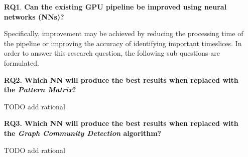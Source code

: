 \begin{enumerate}
  \item[\textbf{RQ1}.] \textbf{Can the existing GPU pipeline be improved using neural networks (NNs)?}

    Specifically, improvement may be achieved by reducing the processing time
    of the pipeline or improving the accuracy of identifying important
    timeslices. In order to answer this research question, the following sub
    questions are formulated.

  \item[\textbf{RQ2.}] \textbf{Which NN will produce the best results when replaced with the \emph{Pattern Matrix}?}

    TODO add rational

  \item[\textbf{RQ3.}] \textbf{Which NN will produce the best results when replaced with the \emph{Graph Community Detection} algorithm?}

    TODO add rational
\end{enumerate}
